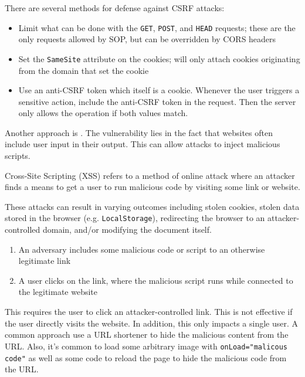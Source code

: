 There are several methods for defense against CSRF attacks:
\begin{itemize}
    \item Limit what can be done with the \texttt{GET}, \texttt{POST}, and \texttt{HEAD} requests; these are the only requests allowed by SOP, but can be overridden by CORS headers
    \item Set the \texttt{SameSite} attribute on the cookies; will only attach cookies originating from the domain that set the cookie
    \item Use an anti-CSRF token which itself is a cookie. Whenever the user triggers a sensitive action, include the anti-CSRF token in the request. Then the server only allows the operation if both values match.
\end{itemize}

Another approach is . The vulnerability lies in the fact that websites often include user input in their output. This can allow attacks to inject malicious scripts.

\begin{dfnbox}{Cross-Site Scripting (XSS)}{}
     refers to a method of online attack where an attacker finds a means to get a user to run malicious code by visiting some link or website.
\end{dfnbox}

These attacks can result in varying outcomes including stolen cookies, stolen data stored in the browser (e.g. \texttt{LocalStorage}), redirecting the browser to an attacker-controlled domain, and/or modifying the document itself.

\begin{enumerate}
    \item An adversary includes some malicious code or script to an otherwise legitimate link
    \item A user clicks on the link, where the malicious script runs while connected to the legitimate website
\end{enumerate}

This requires the user to click an attacker-controlled link. This is not effective if the user directly visits the website. In addition, this only impacts a single user. A common approach use a URL shortener to hide the malicious content from the URL. Also, it's common to load some arbitrary image with \texttt{onLoad="malicous code"} as well as some code to reload the page to hide the malicious code from the URL.

